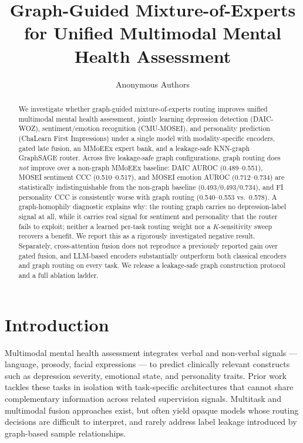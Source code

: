 \documentclass[letterpaper]{article}
\title{Graph-Guided Mixture-of-Experts for Unified Multimodal Mental Health Assessment}
\author{
Anonymous Authors
}
\begin{document}
\maketitle

\begin{abstract}
We investigate whether graph-guided mixture-of-experts routing improves unified multimodal mental health assessment, jointly learning depression detection (DAIC-WOZ), sentiment/emotion recognition (CMU-MOSEI), and personality prediction (ChaLearn First Impressions) under a single model with modality-specific encoders, gated late fusion, an MMoEEx expert bank, and a leakage-safe KNN-graph GraphSAGE router. Across five leakage-safe graph configurations, graph routing does \emph{not} improve over a non-graph MMoEEx baseline: DAIC AUROC (0.489--0.551), MOSEI sentiment CCC (0.510--0.517), and MOSEI emotion AUROC (0.712--0.734) are statistically indistinguishable from the non-graph baseline (0.493/0.493/0.734), and FI personality CCC is consistently worse with graph routing (0.540--0.553 vs.\ 0.578). A graph-homophily diagnostic explains why: the routing graph carries no depression-label signal at all, while it carries real signal for sentiment and personality that the router fails to exploit; neither a learned per-task routing weight nor a $K$-sensitivity sweep recovers a benefit. We report this as a rigorously investigated negative result. Separately, cross-attention fusion does not reproduce a previously reported gain over gated fusion, and LLM-based encoders substantially outperform both classical encoders and graph routing on every task. We release a leakage-safe graph construction protocol and a full ablation ladder.
\end{abstract}

\section{Introduction}

Multimodal mental health assessment integrates verbal and non-verbal signals — language, prosody, facial expressions — to predict clinically relevant constructs such as depression severity, emotional state, and personality traits. Prior work tackles these tasks in isolation with task-specific architectures that cannot share complementary information across related supervision signals. Multitask and multimodal fusion approaches exist, but often yield opaque models whose routing decisions are difficult to interpret, and rarely address label leakage introduced by graph-based sample relationships.
\end{document}
